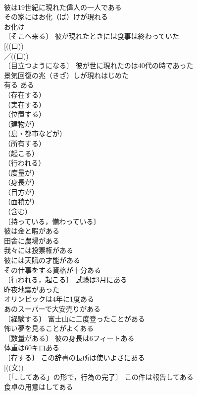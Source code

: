 \documentclass[8pt]{extreport}
\begin{document}
\begin{CJK}{UTF8}{min}
\\	彼は19世紀に現れた偉人の一人である 
\\	その家にはお化（ば）けが現れる 
\\	お化け　
\\	〔そこへ来る〕 彼が現れたときには食事は終わっていた 
\\	[((口))
\\	／((口))
\\	〔目立つようになる〕 彼が世に現れたのは40代の時であった 
\\	景気回復の兆（きざ）しが現れはじめた 
\\	有る	ある	
\\	（存在する）
\\	（実在する）
\\	（位置する）
\\	（建物が）
\\	（島・都市などが）
\\	（所有する）
\\	（起こる）
\\	（行われる）
\\	（度量が）
\\	（身長が）
\\	（目方が）
\\	（面積が）
\\	（含む）
\\	〔持っている，備わっている〕
\\	彼は金と暇がある 
\\	田舎に農場がある 
\\	我々には投票権がある 
\\	彼には天賦の才能がある 
\\	その仕事をする資格が十分ある 
\\	〔行われる，起こる〕 試験は3月にある 
\\	昨夜地震があった 
\\	オリンピックは4年に1度ある 
\\	あのスーパーで大安売りがある 
\\	〔経験する〕 富士山に二度登ったことがある 
\\	怖い夢を見ることがよくある 
\\	〔数量がある〕 彼の身長は6フィートある 
\\	体重は60キロある 
\\	〔存する〕 この辞書の長所は使いよさにある 
\\	[((文))
\\	〔「…してある」の形で，行為の完了〕 この件は報告してある 
\\	食卓の用意はしてある 

\end{CJK}
\end{document}
